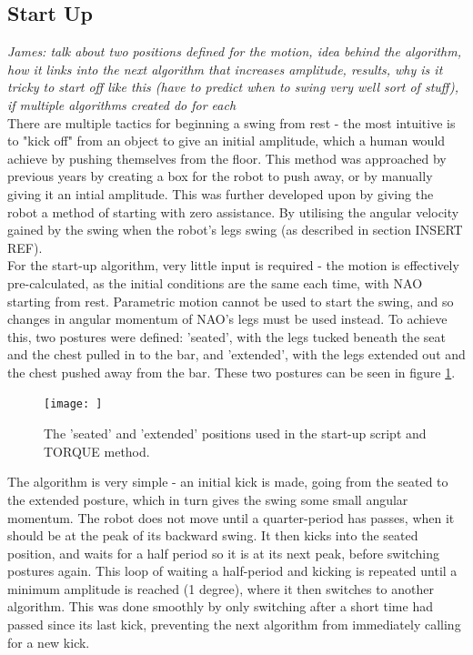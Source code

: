 \documentclass[11pt]{article}
\newcommand*\ruleline[1]{\par\noindent\raisebox{.8ex}{\makebox[\linewidth]{\hrulefill\hspace{1ex}\raisebox{-.8ex}{#1}\hspace{1ex}\hrulefill}}}
\begin{document}
\subsection{Start Up}

\ruleline{James Doering}

\textit{James: talk about two positions defined for the motion, idea behind the algorithm, how it links into the next algorithm that increases amplitude, results, why is it tricky to start off like this (have to predict when to swing very well sort of stuff), if multiple algorithms created do for each} \\

There are multiple tactics for beginning a swing from rest - the most intuitive is to "kick off" from an object to give an initial amplitude, which a human would achieve by pushing themselves from the floor. This method was approached by previous years by creating a box for the robot to push away, or by manually giving it an intial amplitude. This was further developed upon by giving the robot a method of starting with zero assistance. By utilising the angular velocity gained by the swing when the robot's legs swing (as described in section INSERT REF). \\

For the start-up algorithm, very little input is required - the motion is effectively pre-calculated, as the initial conditions are the same each time, with NAO starting from rest. Parametric motion cannot be used to start the swing, and so changes in angular momentum of NAO's legs must be used instead. To achieve this, two postures were defined: 'seated', with the legs tucked beneath the seat and the chest pulled in to the bar, and 'extended', with the legs extended out and the chest pushed away from the bar. These two postures can be seen in figure \ref{fig:seatedextended}.\\

    \begin{figure}
        \centering
        \texttt{[image: ]}
        \caption{The 'seated' and 'extended' positions used in the start-up script and TORQUE method.}
        \label{fig:seatedextended}
    \end{figure}

The algorithm is very simple - an initial kick is made, going from the seated to the extended posture, which in turn gives the swing some small angular momentum. The robot does not move until a quarter-period has passes, when it should be at the peak of its backward swing. It then kicks into the seated position, and waits for a half period so it is at its next peak, before switching postures again. This loop of waiting a half-period and kicking is repeated until a minimum amplitude is reached (1 degree), where it then switches to another algorithm. This was done smoothly by only switching after a short time had passed since its last kick, preventing the next algorithm from immediately calling for a new kick.\\
\end{document}
